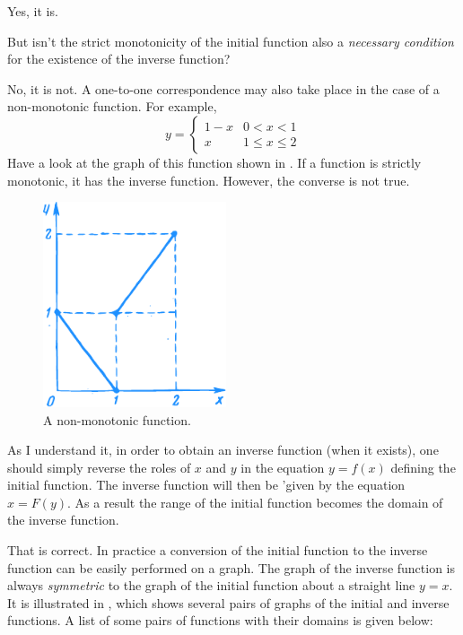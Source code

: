 {\athr Yes, it is.

\rdr But isn't the strict monotonicity of the initial function also a \emph{necessary condition} for the existence of the inverse function?

\athr No, it is not. A one-to-one correspondence may also take place in the case of a non-monotonic function. For example,
\begin{equation*}%
y = 
\begin{cases}
1 - x & 0 < x < 1 \\
x & 1 \leqslant x \leqslant 2
\end{cases}
\end{equation*}
Have a look at the graph of this function shown in . If a function is strictly monotonic, it has the inverse function. However, the converse is not true. 

\begin{figure}[!ht]%
\centering
\includegraphics[width=0.48\textwidth]{figures/fig-19.pdf}
\caption{A non-monotonic function.}
\label{fig-19}
\end{figure}

\rdr As I understand it, in order to obtain an inverse function (when it exists), one should simply reverse the roles of $x$ and $y$ in the equation $y = f (x)$ defining the initial function. The inverse function will then be 'given by the equation $x = F (y)$. As a result the range of the initial function becomes the domain of the inverse function.

\athr That is correct. In practice a conversion of the initial function to the inverse function can be easily performed on a graph. The graph of the inverse function is
always \emph{symmetric} to the graph of the initial function about a straight line $y = x$. It is illustrated in , which shows several pairs of graphs of the initial and inverse functions. A list of some pairs of functions with their domains is given below:


}
